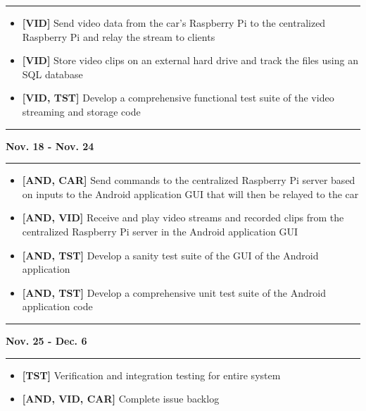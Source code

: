 \documentclass[letterpaper,12pt]{report}
\begin{document}
	\noindent\rule{\textwidth}{0.5pt}
	\begin{itemize}
		\item \textbf{[VID]} Send video data from the car’s Raspberry Pi to the
			centralized Raspberry Pi and relay the stream to clients
		\item \textbf{[VID]} Store video clips on an external hard drive and
			track the files using an SQL database
		\item \textbf{[VID, TST]} Develop a comprehensive functional test suite
			of the video streaming and storage code
	\end{itemize}
	\noindent\rule[0.5em]{\textwidth}{0.5pt}
	\textbf{Nov. 18 - Nov. 24}\\
	\noindent\rule{\textwidth}{0.5pt}
	\begin{itemize}
		\item \textbf{[AND, CAR]} Send commands to the centralized Raspberry Pi
			server based on inputs to the Android application GUI that will then
			be relayed to the car
		\item \textbf{[AND, VID]} Receive and play video streams and recorded
			clips from the centralized Raspberry Pi server in the Android
			application GUI
		\item \textbf{[AND, TST]} Develop a sanity test suite of the GUI of the
			Android application
		\item \textbf{[AND, TST]} Develop a comprehensive unit test suite of the
			Android application code
	\end{itemize}
	\noindent\rule[0.5em]{\textwidth}{0.5pt}
	\textbf{Nov. 25 - Dec. 6}\\
	\noindent\rule{\textwidth}{0.5pt}
	\begin{itemize}
		\item \textbf{[TST]} Verification and integration testing for entire
			system
		\item \textbf{[AND, VID, CAR]} Complete issue backlog
	\end{itemize}
\end{document}

